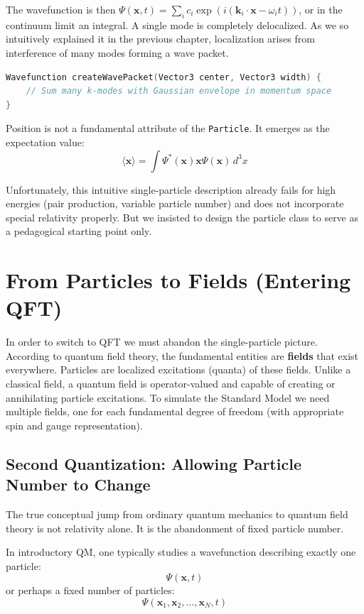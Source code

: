 The wavefunction is then $\Psi(\mathbf{x}, t) = \sum_i c_i \exp(i(\mathbf{k}_i \cdot \mathbf{x} - \omega_i t))$, or in the continuum limit an integral.
A single mode is completely delocalized. As we so intuitively explained it in the previous chapter,
localization arises from interference of many modes forming a wave packet.

\begin{lstlisting}[language=C++, caption=Wave Packet Construction]
Wavefunction createWavePacket(Vector3 center, Vector3 width) {
    // Sum many k-modes with Gaussian envelope in momentum space
}
\end{lstlisting}

Position is not a fundamental attribute of the \texttt{Particle}. It emerges as the expectation value:
\[
\langle \mathbf{x} \rangle = \int \Psi^*(\mathbf{x}) \mathbf{x} \Psi(\mathbf{x}) \, d^3x
\]

Unfortunately, this intuitive single-particle description already fails for high energies (pair production,
variable particle number) and does not incorporate special relativity properly. But we insisted to
design the particle class to serve as a pedagogical starting point only.


\section{From Particles to Fields (Entering QFT)}

In order to switch to QFT we must abandon the single-particle picture.
According to quantum field theory, the fundamental entities are \textbf{fields} that exist everywhere.
Particles are localized excitations (quanta) of these fields.
Unlike a classical field, a quantum field is operator-valued and capable of creating or annihilating particle excitations.
To simulate the Standard Model we need multiple fields, one for each fundamental degree of freedom (with appropriate spin and gauge representation).


\subsection*{Second Quantization: Allowing Particle Number to Change}

The true conceptual jump from ordinary quantum mechanics to quantum field theory is not relativity alone.
It is the abandonment of fixed particle number.

In introductory QM, one typically studies a wavefunction describing exactly one particle:
\[
\Psi(\mathbf{x}, t)
\]
or perhaps a fixed number of particles:
\[
\Psi(\mathbf{x}_1, \mathbf{x}_2, \dots, \mathbf{x}_N, t)
\]


